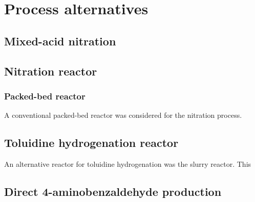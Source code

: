\section{Process alternatives}
\label{app:alternatives}

\subsection{Mixed-acid nitration}
\label{mixed}

\subsection{Nitration reactor}
\label{nitrationreactor}
\subsubsection{Packed-bed reactor}
A conventional packed-bed reactor was considered for the nitration process. 

\subsection{Toluidine hydrogenation reactor}
\label{toluidine}
An alternative reactor for toluidine hydrogenation was the slurry reactor. This


\subsection{Direct 4-aminobenzaldehyde production}
\label{direct}